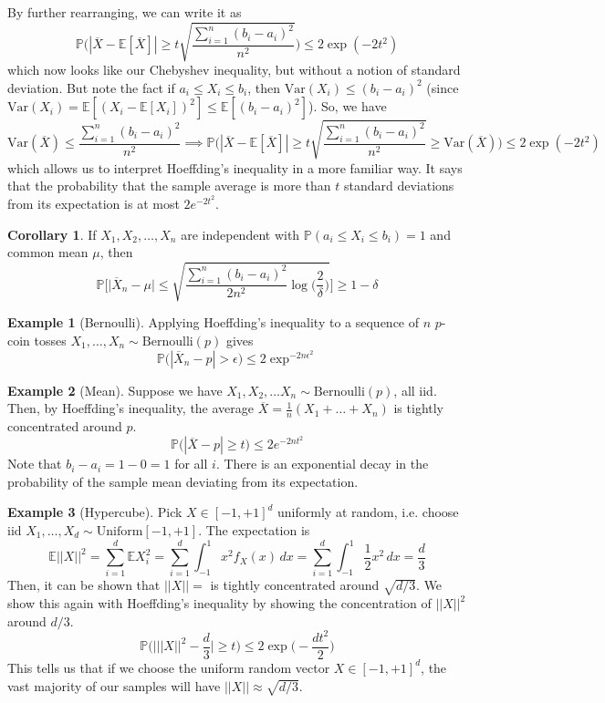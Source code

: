 \documentclass{article}
\theoremstyle{definition}
\newtheorem{example}{Example}[section]
\newtheorem{corollary}{Corollary}[theorem]
\theoremstyle{remark}
\theoremstyle{definition}
\begin{document}
By further rearranging, we can write it as 
\[\mathbb{P} \bigg( | \overline{X} - \mathbb{E}[\overline{X}] | \geq t \sqrt{\frac{\sum_{i=1}^n (b_i - a_i)^2}{n^2}} \bigg) \leq 2 \exp(-2t^2)\]
which now looks like our Chebyshev inequality, but without a notion of standard deviation. But note the fact if $a_i \leq X_i \leq b_i$, then $\mathrm{Var}(X_i) \leq (b_i - a_i)^2$ (since $\mathrm{Var}(X_i) = \mathbb{E}[(X_i - \mathbb{E}[X_i])^2] \leq \mathbb{E}[(b_i - a_i)^2]$). So, we have 
\[\mathrm{Var}(\overline{X}) \leq \frac{\sum_{i=1}^n (b_i - a_i)^2}{n^2} \implies \mathbb{P}\bigg( |\overline{X} - \mathbb{E}[\overline{X}] | \geq t \sqrt{\frac{\sum_{i=1}^n (b_i - a_i)^2}{n^2}} \geq \mathrm{Var}(\overline{X}) \bigg) \leq 2\exp(-2t^2)\]
which allows us to interpret Hoeffding's inequality in a more familiar way. It says that the probability that the sample average is more than $t$ standard deviations from its expectation is at most $2 e^{-2t^2}$. 

\begin{corollary}
If $X_1, X_2, \ldots, X_n$ are independent with $\mathbb{P}(a_i \leq X_i \leq b_i) = 1$ and common mean $\mu$, then 
\[\mathbb{P}\bigg[ \big| \overline{X}_n - \mu \big| \leq \sqrt{ \frac{\sum_{i=1}^n (b_i - a_i)^2}{2n^2} \log \Big(\frac{2}{\delta}\Big)} \bigg] \geq 1 - \delta\]
\end{corollary}

\begin{example}[Bernoulli]
Applying Hoeffding's inequality to a sequence of $n$ $p$-coin tosses $X_1, \ldots, X_n \sim \mathrm{Bernoulli}(p)$ gives 
\[\mathbb{P}\big( | \overline{X}_n - p | > \epsilon \big) \leq 2 \exp^{-2 n \epsilon^2}\]
\end{example}

\begin{example}[Mean]
Suppose we have $X_1, X_2, \ldots X_n \sim \mathrm{Bernoulli}(p)$, all iid. Then, by Hoeffding's inequality, the average $\overline{X} = \frac{1}{n} (X_1 + \ldots + X_n)$ is tightly concentrated around $p$. 
\[\mathbb{P} \big( | \overline{X} - p | \geq t \big) \leq 2 e^{-2 n t^2}\]
Note that $b_i - a_i = 1 - 0 = 1$ for all $i$. There is an exponential decay in the probability of the sample mean deviating from its expectation. 
\end{example}

\begin{example}[Hypercube]
  Pick $X \in [-1, +1]^d$ uniformly at random, i.e. choose iid $X_1,\ldots, X_d \sim \mathrm{Uniform}[-1, +1]$. The expectation is 
  \[\mathbb{E} ||X||^2 = \sum_{i=1}^d \mathbb{E} X_i^2 = \sum_{i=1}^d \int_{-1}^1 x^2 f_X (x) \,dx = \sum_{i=1}^d \int_{-1}^1 \frac{1}{2} x^2 \,dx = \frac{d}{3}\]
  Then, it can be shown that $||X|| = $ is tightly concentrated around $\sqrt{d/3}$. We show this again with Hoeffding's inequality by showing the concentration of $||X||^2$ around $d/3$. 
  \[\mathbb{P} \bigg( \bigg| ||X||^2 - \frac{d}{3} \bigg| \geq t \bigg) \leq 2 \exp \Big( - \frac{ d t^2}{2} \Big)\]
  This tells us that if we choose the uniform random vector $X \in [-1, +1]^d$, the vast majority of our samples will have $||X|| \approx \sqrt{d/3}$. 
\end{example}
\end{document}

